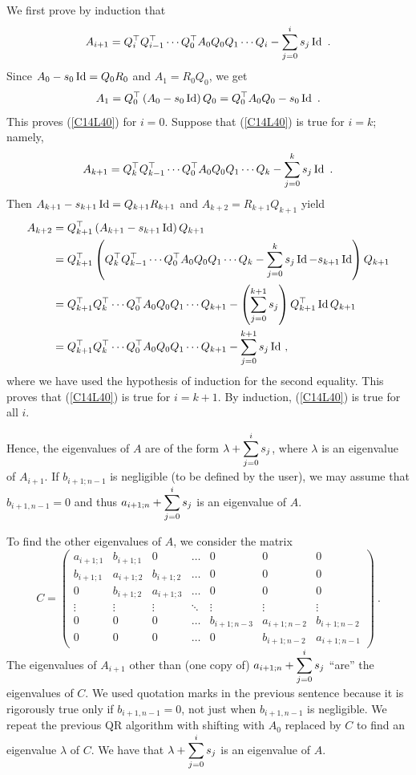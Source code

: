 We first prove by induction that
\begin{equation} \label{C14L40}
  A_{i+1} = Q_i^\top Q_{i-1}^\top \cdots Q_0^\top A_0 Q_0 Q_1 \cdots
  Q_i - \sum_{j=0}^i s_j \operatorname{Id} \ .
\end{equation}
Since $A_0 - s_0 \operatorname{Id} = Q_0R_0$ and $A_1= R_0Q_0$, we get
\[
A_1 = Q_0^\top \left(A_0 - s_0 \operatorname{Id}\right) Q_0 = Q_0^\top A_0 Q_0 -s_0 \operatorname{Id} \ .
\]
This proves (\ref{C14L40}) for $i=0$.  Suppose that (\ref{C14L40})
is true for $i=k$; namely,
\[
A_{k+1} = Q_k^\top Q_{k-1}^\top \cdots Q_0^\top A_0 Q_0 Q_1 \cdots Q_k -
\sum_{j=0}^k s_j \operatorname{Id} \ .
\]
Then $A_{k+1} - s_{k+1} \operatorname{Id} = Q_{k+1}R_{k+1}$ and $A_{k+2}= R_{k+1} Q_{k+1}$
yield
\begin{align*}
A_{k+2} &= Q_{k+1}^\top \left( A_{k+1} - s_{k+1} \operatorname{Id}\right) Q_{k+1} \\
&= Q_{k+1}^\top \left( Q_k^\top Q_{k-1}^\top \cdots Q_0^\top A_0 Q_0 Q_1
\cdots Q_k - \sum_{j=0}^k s_j \operatorname{Id} - s_{k+1} \operatorname{Id} \right) Q_{k+1} \\
&= Q_{k+1}^\top Q_k^\top \cdots Q_0^\top A_0 Q_0 Q_1 \cdots Q_{k+1} -
\left( \sum_{j=0}^{k+1} s_j \right) Q_{k+1}^\top \operatorname{Id}  Q_{k+1} \\
&= Q_{k+1}^\top Q_k^\top\cdots Q_0^\top A_0 Q_0 Q_1 \cdots Q_{k+1}
- \sum_{j=0}^{k+1} s_j \operatorname{Id} \ ,
\end{align*}
where we have used the hypothesis of induction for the second equality.
This proves that (\ref{C14L40}) is true for $i=k+1$.
By induction, (\ref{C14L40}) is true for all $i$.

Hence, the eigenvalues of $A$ are of the form
$\displaystyle \lambda + \sum_{j=0}^i s_j$, where $\lambda$ is an eigenvalue
of $A_{i+1}$.
If $b_{i+1;n-1}$ is negligible (to be defined by the user), we may assume
that $b_{i+1,n-1}=0$ and thus $\displaystyle a_{i+1;n} + \sum_{j=0}^i s_j$
is an eigenvalue of $A$.

To find the other eigenvalues of $A$, we consider the
 matrix
\[
C = \begin{pmatrix}
a_{i+1;1} & b_{i+1;1} & 0 & \ldots & 0 & 0 & 0 \\
b_{i+1;1} & a_{i+1;2} & b_{i+1;2} & \ldots & 0 & 0 & 0 \\
0 & b_{i+1;2} & a_{i+1;3} & \ldots & 0 & 0 & 0 \\
\vdots & \vdots & \vdots & \ddots & \vdots & \vdots & \vdots \\
0 & 0 & 0 & \ldots & b_{i+1;n-3} & a_{i+1;n-2} & b_{i+1;n-2} \\
0 & 0 & 0 & \ldots & 0 & b_{i+1;n-2} & a_{i+1;n-1}
\end{pmatrix} \ .
\]
The eigenvalues of $A_{i+1}$ other than (one copy of)
$\displaystyle a_{i+1;n} + \sum_{j=0}^i s_j$ ``are'' the eigenvalues
of $C$.  We used quotation marks in the previous sentence because it is
rigorously true only if $b_{i+1,n-1} = 0$, not just when $b_{i+1,n-1}$
is negligible.  We repeat the previous QR algorithm with shifting with
$A_0$ replaced by $C$ to find an eigenvalue $\lambda$ of $C$.  We have
that $\displaystyle \lambda + \sum_{j=0}^i s_j$ is an eigenvalue of $A$.

